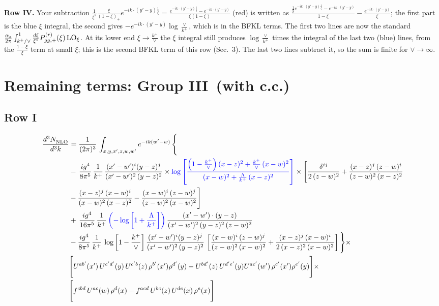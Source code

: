 \documentclass[9pt]{article}
\newcommand{\new}[1]{{\color{blue}#1}}
\numberwithin{equation}{section}
\begin{document}
\new{\textbf{Row IV.} Your subtraction $\frac{1}{\xi^2}\frac{\xi}{(1-\xi)_+}e^{-ik\cdot(y'-y)\frac1\xi}=\frac{e^{-ik\cdot(y'-y)\frac1\xi}-e^{-ik\cdot(y'-y)}}{\xi(1-\xi)}$ (red) is written as $\frac{\frac1\xi e^{-ik\cdot(y'-y)\frac1\xi}-e^{-ik\cdot(y'-y)}}{1-\xi}-\frac{e^{-ik\cdot(y'-y)}}{\xi}$; the first part is the blue $\xi$ integral, the second gives $-e^{-ik\cdot(y'-y)}\log\frac{\vee}{k^+}$, which is in the BFKL terms. The first two lines are now the standard $\frac{\alpha_s}{2\pi}\int_{k^+/\vee}^1\frac{d\xi}{\xi^2}P^{(r)}_{gg,+}(\xi)\,{\rm LO}_\xi$. At its lower end $\xi\to\frac{k^+}{\vee}$ the $\xi$ integral still produces $\log\frac{\vee}{k^+}$ times the integral of the last two (blue) lines, from the $\frac{1-\xi}{\xi}$ term at small $\xi$; this is the second BFKL term of this row (Sec.~3). The last two lines subtract it, so the sum is finite for $\vee\to\infty$.}

\section{Remaining terms: Group III\, (with c.c.)}
\subsection{Row I}
\begin{align}
     \frac{d^{3}N_{\rm NLO}^{\rm}}{d^{3}k}  & =  \frac{1}{(2\pi)^{3}}\, \int_{x,y,x',z,w,w^{\prime}} e^{-ik(w^{\prime}-w)}\, \Bigg\{\notag \\ & -\,\frac{ig^{4}}{8\pi^{5}}\,\frac{1}{k^{+}}\,\frac{(x'-w')^{i}(y-z)^{j}}{(x'-w')^{2}\,(y-z)^{2}}\times \new{\log{\left[\frac{\left(1-\frac{k^{+}}{\vee}\right)(x-z)^{2}+\frac{k^{+}}{\vee}\,(x-w)^{2}}{(x-w)^{2}+\frac{\Lambda}{k^{+}}\,(x-z)^{2}}\right]}}\times \Bigg[\frac{\delta^{ij}}{2\,(z-w)^{2}}+\frac{(x-z)^{j}\,(z-w)^{i}}{(z-w)^{2}\,(x-z)^{2}}\notag \\ & -\frac{(x-z)^{j}\,(x-w)^{i}}{(x-w)^{2}\,(x-z)^{2}}-\frac{(x-w)^{i}\,(z-w)^{j}}{(z-w)^{2}\,(x-w)^{2}}\Bigg]\notag \\ & +\,\frac{ig^{4}}{16\pi^{5}}\,\frac{1}{k^{+}}\,\new{\left(-\log{\left[1+\frac{\Lambda}{k^{+}}\right]}\right)}\, \frac{(x'-w')\cdot (y-z)}{(x'-w')^{2}\,(y-z)^{2}\,(z-w)^{2}}\notag \\ & -\frac{ig^{4}}{8\pi^{5}}\,\frac{1}{k^{+}}\, \log{\left[1-\frac{k^{+}}{\vee}\right]}\,\frac{(x'-w')^{i}(y-z)^{j}}{(x'-w')^{2}\,(y-z)^{2}}\,\left[\frac{(x-w)^{i}\,(z-w)^{j}}{(z-w)^{2}\,(x-w)^{2}}+\frac{(x-z)^{j}\,(x-w)^{i}}{2\,(x-z)^{2}\, (x-w)^{2}}\right]\Bigg\}\times \notag \\ &  \Bigg[U^{ab'}(x')\,U^{c'd'}(y)\,U^{c'b}(z)\,\rho^{b'}(x')\rho^{d'}(y)-U^{bd'}(z)\,U^{d'e'}(y)U^{ac'}(w')\,\rho^{c'}(x')\rho^{e'}(y)\Bigg]\times\notag \\ & \Bigg[f^{cbd}\,U^{ac}(w)\,\rho^{d}(x)-f^{acd}\, U^{bc}(z)\,U^{de}(x)\,\rho^{e}(x)\Bigg] 
\end{align}
\end{document}
